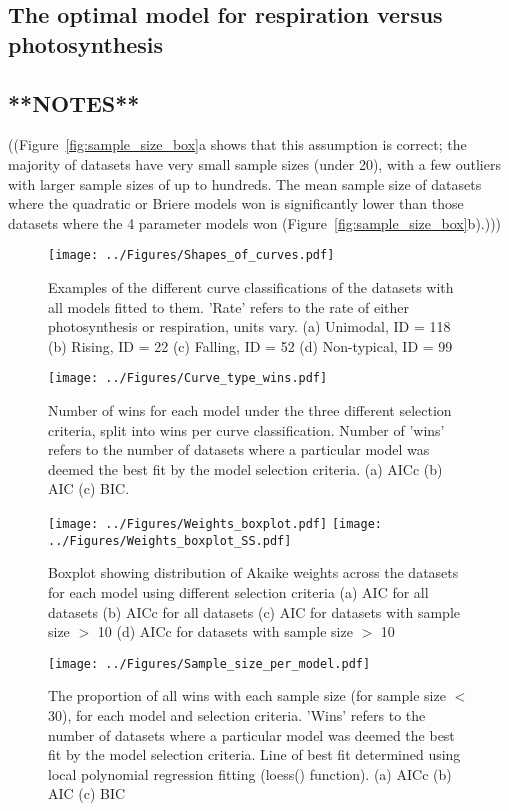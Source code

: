 \documentclass[11pt]{article}
\begin{document}
\subsection{The optimal model for respiration versus photosynthesis}




\subsection{**NOTES**}
((Figure~\ref{fig:sample_size_box}a shows that this assumption is correct; the majority of datasets have very small sample sizes (under 20), with a few outliers with larger sample sizes of up to hundreds.
The mean sample size of datasets where the quadratic or Briere models won is significantly lower than those datasets where the 4 parameter models won (Figure~\ref{fig:sample_size_box}b).)))


\begin{figure} [H]
	\texttt{[image: ../Figures/Shapes\_of\_curves.pdf]}
	\caption{\label{fig:curves} Examples of the different curve classifications of the datasets with all models fitted to them. 'Rate' refers to the rate of either photosynthesis or respiration, units vary. (a) Unimodal, ID = 118 (b) Rising, ID = 22 (c) Falling, ID = 52 (d) Non-typical, ID = 99}
\end{figure}

\begin{figure} [H]
	\centering
	\texttt{[image: ../Figures/Curve\_type\_wins.pdf]}
	\caption{\label{fig:wins_plot} Number of wins for each model under the three different selection criteria, split into wins per curve classification. Number of 'wins' refers to the number of datasets where a particular model was deemed the best fit by the model selection criteria. (a) AICc (b) AIC (c) BIC.}	
\end{figure}

\begin{figure} [H]
	\texttt{[image: ../Figures/Weights\_boxplot.pdf]}
	\texttt{[image: ../Figures/Weights\_boxplot\_SS.pdf]}
	\caption{\label{fig:weights} Boxplot showing distribution of Akaike weights across the datasets for each model using different selection criteria (a) AIC for all datasets (b) AICc for all datasets (c) AIC for datasets with sample size $>$ 10 (d) AICc for datasets with sample size $>$ 10}
\end{figure}


\begin{figure} [H]
	\texttt{[image: ../Figures/Sample\_size\_per\_model.pdf]}
	\caption{\label{fig:sample_size_line} The proportion of all wins with each sample size (for sample size $<$ 30), for each model and selection criteria. 'Wins' refers to the number of datasets where a particular model was deemed the best fit by the model selection criteria. Line of best fit determined using local polynomial regression fitting (loess() function). (a) AICc (b) AIC (c) BIC}
\end{figure}
\end{document}
